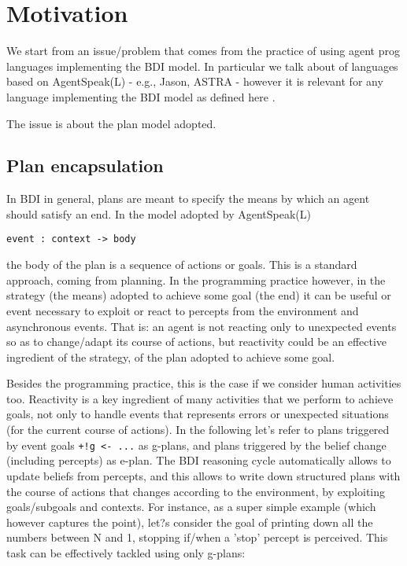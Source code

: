 \section{Motivation}
\label{sec:motivation}

We start from an issue/problem that comes from the practice of using agent prog languages implementing the BDI model. 
%
In particular we talk about of languages based on AgentSpeak(L) - e.g., Jason, ASTRA - however it is relevant for any language implementing the BDI model as defined here \cite{}.

The issue is about the plan model adopted.

\subsection{Plan encapsulation}
%
In BDI in general, plans are meant to specify the means by which an agent should satisfy an end.  In the model adopted by AgentSpeak(L) 

\begin{small}
\begin{verbatim}
event : context -> body
\end{verbatim}
\end{small}

the body of the plan is a sequence of actions or goals. This is a standard approach, coming from planning.
%
In the programming practice however, in the strategy (the means) adopted to achieve some goal (the end) it can be useful or event necessary to exploit or react to percepts from the environment and  asynchronous events.   That is: an agent is not reacting only to unexpected events so as to change/adapt its course of actions, but reactivity could be an effective ingredient of the strategy, of the plan adopted to achieve some goal.

Besides the programming practice, this is the case if we consider human activities too. Reactivity is a key ingredient of many activities that we perform to achieve goals, not only to handle events that represents errors or unexpected situations (for the current course of actions).
%
In the following let's refer to plans triggered by event goals \texttt{+!g <- ...} as g-plans, and plans triggered by the belief change (including percepts) as e-plan.
%
The BDI reasoning cycle automatically allows to update beliefs from percepts, and this allows to write down structured plans with the course of actions that changes according to the environment, by exploiting goals/subgoals and contexts.
%
For instance, as a super simple example (which however captures the point), let?s consider the goal of  printing down all the numbers between N and 1, stopping if/when a 'stop' percept is perceived. 
%
This task can be effectively tackled using only g-plans:

